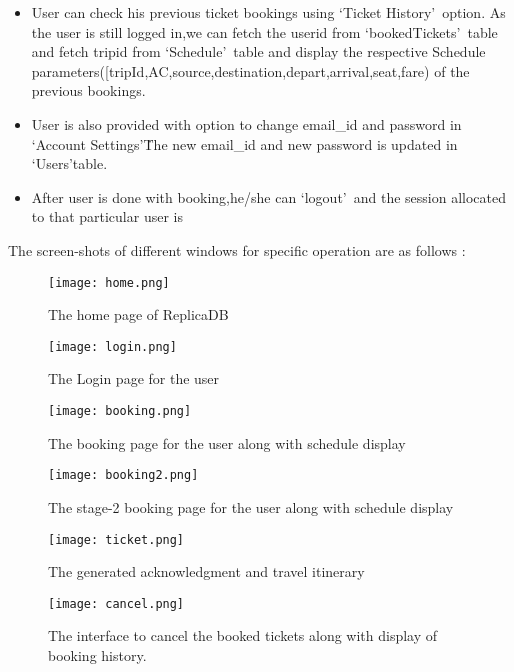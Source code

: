 \documentclass[hidelinks=true]{article}
\begin{document}
\begin{itemize}
\item User can check his previous ticket bookings using \lq Ticket History\rq\ option. As the user is still logged in,we can fetch the userid from \lq bookedTickets\rq\ table and fetch tripid from \lq Schedule\rq\ table and display the respective Schedule parameters([tripId,AC,source,destination,depart,arrival,seat,fare) of the previous bookings.


\item User is also provided with option to change email\_id and password in \lq Account Settings\rq\.The new email\_id and new password is updated in \lq Users\rq table.
\item After user is done with booking,he/she can \lq logout\rq\ and the session allocated to that particular user is 
\end{itemize}

\pagebreak
The screen-shots of different windows for specific operation are as follows : 

\begin{figure}[ht]
\texttt{[image: home.png]}
\caption{The home page of ReplicaDB}
\end{figure}

\begin{figure}[ht]
\texttt{[image: login.png]}
\caption{The Login page for the user}
\end{figure}

\begin{figure}[ht]
\texttt{[image: booking.png]}
\caption{The booking page for the user along with schedule display}
\end{figure}

\begin{figure}[ht]
\texttt{[image: booking2.png]}
\caption{The stage-2 booking page for the user along with schedule display}
\end{figure}

\begin{figure}[ht]
\texttt{[image: ticket.png]}
\caption{The generated acknowledgment and travel itinerary }
\end{figure}

\begin{figure}[ht]
\texttt{[image: cancel.png]}
\caption{The interface to cancel the booked tickets along with display of booking history.}
\end{figure}
\end{document}
